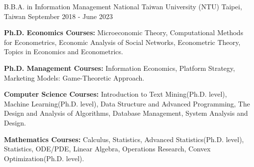 

\begin{cventries}

  \cventry
  {B.B.A. in Information Management} %
    {National Taiwan University (NTU)} %
    {Taipei, Taiwan} %
    {September 2018 - June 2023} %
    {
      \begin{cvitems} %
        \item   \textbf{Ph.D. Economics Courses:}
                Microeconomic Theory,
                Computational Methods for Econometrics,
                Economic Analysis of Social Networks,
                Econometric Theory,
                Topics in Economics and Econometrics.
        \item   \textbf{Ph.D. Management Courses:}
                Information Economics, Platform Strategy,
                Marketing Models: Game-Theoretic Approach.
        \item   \textbf{Computer Science Courses:}
            Introduction to Text Mining(Ph.D. level),
            Machine Learning(Ph.D. level),
                Data Structure and Advanced Programming,
                The Design and Analysis of Algorithms,
                Database Management,
                System Analysis and Design.
        \item   \textbf{Mathematics Courses:}
                Calculus,
                Statistics, Advanced Statistics(Ph.D. level),
                Statistics,
                ODE/PDE,
                Linear Algebra,
                Operations Research,
                Convex Optimization(Ph.D. level).
      \end{cvitems}
    }

\end{cventries}
